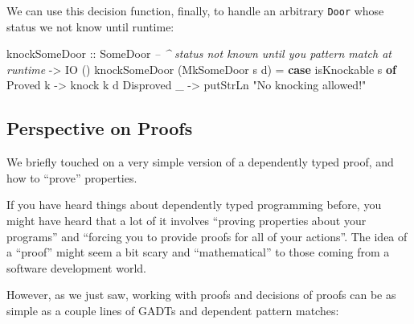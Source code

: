 \documentclass[]{article}
\newenvironment{Shaded}{}{}
\newcommand{\CommentTok}[1]{\textcolor[rgb]{0.38,0.63,0.69}{\textit{#1}}}
\newcommand{\DataTypeTok}[1]{\textcolor[rgb]{0.56,0.13,0.00}{#1}}
\newcommand{\FunctionTok}[1]{\textcolor[rgb]{0.02,0.16,0.49}{#1}}
\newcommand{\KeywordTok}[1]{\textcolor[rgb]{0.00,0.44,0.13}{\textbf{#1}}}
\newcommand{\NormalTok}[1]{#1}
\newcommand{\OtherTok}[1]{\textcolor[rgb]{0.00,0.44,0.13}{#1}}
\newcommand{\StringTok}[1]{\textcolor[rgb]{0.25,0.44,0.63}{#1}}
\begin{document}
We can use this decision function, finally, to handle an arbitrary \texttt{Door}
whose status we not know until runtime:

\begin{Shaded}
\begin{Highlighting}[]
\NormalTok{knockSomeDoor}
\OtherTok{    ::} \DataTypeTok{SomeDoor}     \CommentTok{-- ^ status not known until you pattern match at runtime}
    \OtherTok{->} \DataTypeTok{IO}\NormalTok{ ()}
\NormalTok{knockSomeDoor (}\DataTypeTok{MkSomeDoor}\NormalTok{ s d) }\FunctionTok{=} \KeywordTok{case}\NormalTok{ isKnockable s }\KeywordTok{of}
    \DataTypeTok{Proved}\NormalTok{ k    }\OtherTok{->}\NormalTok{ knock k d}
    \DataTypeTok{Disproved}\NormalTok{ _ }\OtherTok{->}\NormalTok{ putStrLn }\StringTok{"No knocking allowed!"}
\end{Highlighting}
\end{Shaded}

\hypertarget{perspective-on-proofs}{%
\subsection{Perspective on Proofs}\label{perspective-on-proofs}}

We briefly touched on a very simple version of a dependently typed proof, and
how to ``prove'' properties.

If you have heard things about dependently typed programming before, you might
have heard that a lot of it involves ``proving properties about your programs''
and ``forcing you to provide proofs for all of your actions''. The idea of a
``proof'' might seem a bit scary and ``mathematical'' to those coming from a
software development world.

However, as we just saw, working with proofs and decisions of proofs can be as
simple as a couple lines of GADTs and dependent pattern matches:

\begin{Shaded}
\end{Shaded}
\end{document}
